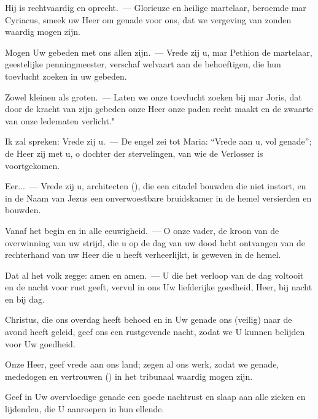 \documentclass[12pt,twoside,a5paper]{article}
\begin{document}
\begin{halfparskip}
  Hij is rechtvaardig en oprecht.~--- Glorieuze en heilige martelaar, beroemde mar Cyriacus, smeek uw Heer om genade voor ons, dat we vergeving van zonden waardig mogen zijn.

  Mogen Uw gebeden met ons allen zijn.~--- Vrede zij u, mar Pethion de martelaar, geestelijke penningmeester, verschaf welvaart aan de behoeftigen, die hun toevlucht zoeken in uw gebeden.

  Zowel kleinen als groten.~--- Laten we onze toevlucht zoeken bij mar Joris, dat door de kracht van zijn gebeden onze Heer onze paden recht maakt en de zwaarte van onze ledematen verlicht."

  Ik zal spreken: Vrede zij u.~--- De engel zei tot Maria: ``Vrede aan u, vol genade''; de Heer zij met u, o dochter der stervelingen, van wie de Verlosser is voortgekomen.

  Eer...~--- Vrede zij u, architecten (), die een citadel bouwden die niet instort, en in de Naam van Jezus een onverwoestbare bruidskamer in de hemel versierden en bouwden.

  Vanaf het begin en in alle eeuwigheid.~--- O onze vader, de kroon van de overwinning van uw strijd, die u op de dag van uw dood hebt ontvangen van de rechterhand van uw Heer die u heeft verheerlijkt, is geweven in de hemel.

  Dat al het volk zegge: amen en amen.~--- U die het verloop van de dag voltooit en de nacht voor rust geeft, vervul in ons Uw liefderijke goedheid, Heer, bij nacht en bij dag.

  Christus, die ons overdag heeft behoed en in Uw genade ons (veilig) naar de avond heeft geleid, geef ons een rustgevende nacht, zodat we U kunnen belijden voor Uw goedheid.

  Onze Heer, geef vrede aan ons land; zegen al ons werk, zodat we genade, mededogen en vertrouwen () in het tribunaal waardig mogen zijn.

  Geef in Uw overvloedige genade een goede nachtrust en slaap aan alle zieken en lijdenden, die U aanroepen in hun ellende.
\end{halfparskip}
\end{document}
